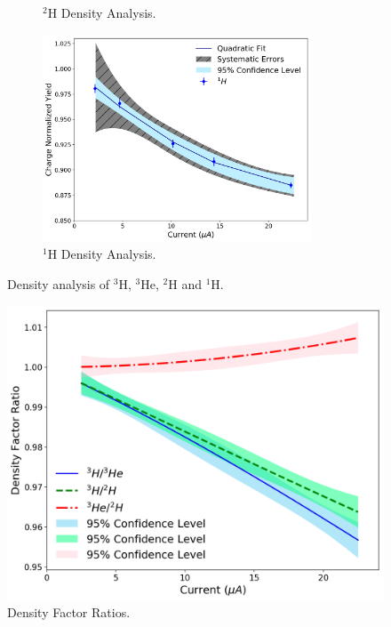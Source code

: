 \documentclass[final,5p,times,twocolumn]{elsarticle}
\begin{document}
\begin{figure}[h]
\begin{center}
\begin{subfigure}{8cm}
    \caption{$^{2}$H Density Analysis.}
    \label{fig:deuterium_data}
  \end{subfigure}
  \begin{subfigure}{8cm}
    \centering\includegraphics[width=8cm]{images/hydrogen_data.pdf}
    \caption{$^{1}$H Density Analysis.}
    \label{fig:hydrogen_data}
  \end{subfigure}
  \end{center}
  \label{fig:tritium_targets}
  \caption{Density analysis of $^{3}$H, $^{3}$He, $^{2}$H and $^{1}$H.}
\end{figure}


%


\begin{figure}[!h]
 \centering
 \includegraphics[width=\linewidth]{images/density_factor_ratios.pdf}
  \caption{Density Factor Ratios. }
  \label{fig:density_ratios}
\end{figure}
\end{document}
